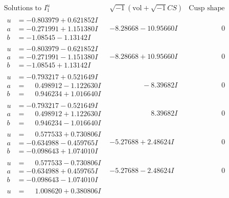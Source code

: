 \documentclass[1p]{elsarticle_modified}
\theoremstyle{definition}
\newcommand{\I}{\sqrt{-1}}
\begin{document}
$$\begin{array}{c|c|c}  
\text{Solutions to }I^u_{1}& \I (\text{vol} + \sqrt{-1}CS) & \text{Cusp shape}\\
 \hline 
\begin{aligned}
u &= -0.803979 + 0.621852 I \\
a &= -0.271991 + 1.151380 I \\
b &= -1.08545 - 1.13142 I\end{aligned}
 & -8.28668 - 10.95660 I & \phantom{-0.000000 } 0 \\ \hline\begin{aligned}
u &= -0.803979 - 0.621852 I \\
a &= -0.271991 - 1.151380 I \\
b &= -1.08545 + 1.13142 I\end{aligned}
 & -8.28668 + 10.95660 I & \phantom{-0.000000 } 0 \\ \hline\begin{aligned}
u &= -0.793217 + 0.521649 I \\
a &= \phantom{-}0.498912 - 1.122630 I \\
b &= \phantom{-}0.946234 + 1.016640 I\end{aligned}
 & \phantom{-0.000000 } -8.39682 I & \phantom{-0.000000 } 0 \\ \hline\begin{aligned}
u &= -0.793217 - 0.521649 I \\
a &= \phantom{-}0.498912 + 1.122630 I \\
b &= \phantom{-}0.946234 - 1.016640 I\end{aligned}
 & \phantom{-0.000000 -}8.39682 I & \phantom{-0.000000 } 0 \\ \hline\begin{aligned}
u &= \phantom{-}0.577533 + 0.730806 I \\
a &= -0.634988 - 0.459765 I \\
b &= -0.098643 + 1.074010 I\end{aligned}
 & -5.27688 + 2.48624 I & \phantom{-0.000000 } 0 \\ \hline\begin{aligned}
u &= \phantom{-}0.577533 - 0.730806 I \\
a &= -0.634988 + 0.459765 I \\
b &= -0.098643 - 1.074010 I\end{aligned}
 & -5.27688 - 2.48624 I & \phantom{-0.000000 } 0 \\ \hline\begin{aligned}
u &= \phantom{-}1.008620 + 0.380806 I \\

\end{aligned}
\end{array}$$
\end{document}
